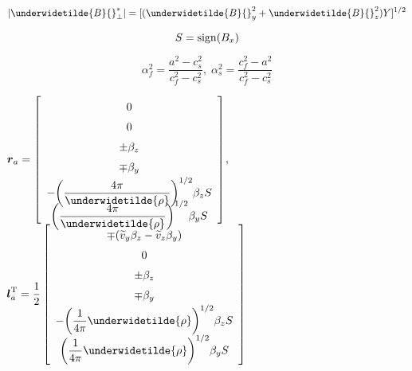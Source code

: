 \begin{equation}
| \underwidetilde{B}{}^{\ast}_{\bot} | = [ ( \underwidetilde{B}{}_{y}^{2} +
\underwidetilde{B}{}_{z}^{2} )Y ]^{1/2}
\vspace{-8pt}
\end{equation}

\begin{equation}
S = {\rm sign} (B_{x})
\end{equation}

\begin{equation}
\alpha_{f}^2 = \frac{a^2 - c_{s}^2}{c_{f}^2 - c_{s}^2}
, \;
\alpha_{s}^2 = \frac{c_{f}^2 - a^2}{c_{f}^2 - c_{s}^2}
\end{equation}

\begin{center}
$\renewcommand{\arraystretch}{1.5}
\mbox{\boldmath $r$}_{a} =
\left[
\begin{array}{c}
0 \\
0 \\
\pm \beta_{z} \\
\mp \beta_{y} \\
\displaystyle
- \biggl( \frac{4 \pi}{\underwidetilde{\rho}} \biggr)^{1/2}
\beta_{z} S \vspace{-6pt} \\ 
\displaystyle
\biggl( \frac{4 \pi}{\underwidetilde{\rho}} \biggr)^{1/2}
\beta_{y} S \vspace{-6pt} \\ 
\end{array} 
\right]$, $\;$
$\renewcommand{\arraystretch}{1.5}
\displaystyle
\mbox{\boldmath $l$}_{a}^{\rm T} =
\frac{1}{2}
\left[
\begin{array}{c}
\mp ( \widetilde{v}_{y} \beta_{z} - \widetilde{v}_{z} \beta_{y}) \\
0 \\
\pm \beta_{z} \\
\mp \beta_{y} \\
\displaystyle
- \biggl( \frac1{4 \pi} {\underwidetilde{\rho}} \biggr)^{1/2}
\beta_{z} S \\
\displaystyle
\biggl( \frac1{4 \pi} {\underwidetilde{\rho}} \biggr)^{1/2}
\beta_{y} S \\
\end{array}
\right]$ 
\end{center}

\newpage

